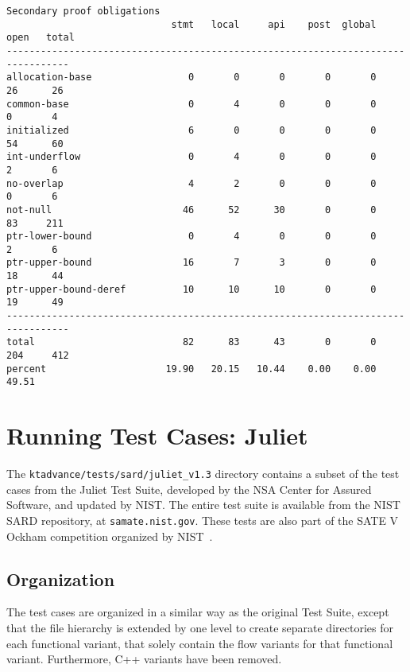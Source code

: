 \documentclass[11pt]{article}
\begin{document}
\begin{scriptsize}
\begin{verbatim}
Secondary proof obligations
                             stmt   local     api    post  global    open   total
---------------------------------------------------------------------------------
allocation-base                 0       0       0       0       0      26      26
common-base                     0       4       0       0       0       0       4
initialized                     6       0       0       0       0      54      60
int-underflow                   0       4       0       0       0       2       6
no-overlap                      4       2       0       0       0       0       6
not-null                       46      52      30       0       0      83     211
ptr-lower-bound                 0       4       0       0       0       2       6
ptr-upper-bound                16       7       3       0       0      18      44
ptr-upper-bound-deref          10      10      10       0       0      19      49
---------------------------------------------------------------------------------
total                          82      83      43       0       0     204     412
percent                     19.90   20.15   10.44    0.00    0.00   49.51
\end{verbatim}
\end{scriptsize}

\section{Running Test Cases: Juliet}
\label{sec:juliettests}

The {\tt ktadvance/tests/sard/juliet\_v1.3} directory contains a subset of the 
test cases from the Juliet Test Suite, developed by the NSA Center for Assured 
Software, and updated by NIST. The entire test suite is available from the
NIST SARD repository, at {\tt samate.nist.gov}. These tests are also part of the
SATE V Ockham competition organized by NIST~\cite{Ockham}.

\subsection{Organization}
The test cases are organized in a similar way as the original Test Suite, except 
that the file hierarchy is extended by one level to create separate directories 
for each functional variant, that solely contain the flow variants for that 
functional variant. Furthermore, C++ variants have been removed.
\end{document}

